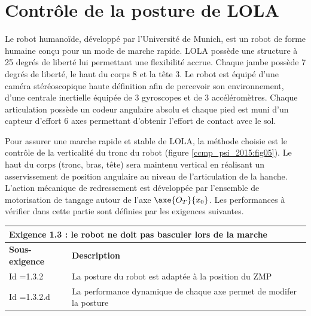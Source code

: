 \section{Contrôle de la posture de LOLA}%

\ifprof
\else
Le robot humanoïde, développé par l’Université de Munich, est un robot de forme humaine conçu pour un mode de marche rapide. LOLA possède une structure à 25 degrés de liberté lui permettant une flexibilité accrue. Chaque jambe possède 7 degrés de liberté, le haut du corps 8 et la tête 3. Le robot est équipé d’une caméra stéréoscopique haute définition afin de percevoir son environnement, d’une centrale inertielle équipée de 3 gyroscopes et de 3 accéléromètres. Chaque articulation possède un codeur angulaire absolu et chaque pied est muni d’un capteur d’effort 6 axes permettant d’obtenir l’effort de contact avec le sol.


\label{ccmp_psi_2015:p02}
Pour assurer une marche rapide et stable de LOLA, la méthode choisie est le contrôle de la verticalité du tronc du robot (figure \ref{ccmp_psi_2015:fig05}). Le haut du corps (tronc, bras, tête) sera maintenu vertical en réalisant un asservissement de position angulaire au niveau de l'articulation de la hanche. L'action mécanique de redressement est développée par l'ensemble de motorisation de tangage autour de l'axe $\axe{O_T}{x_0}$. Les performances à vérifier dans cette partie sont définies par les exigences suivantes.



\begin{center}
\begin{tabular}{ll}
\multicolumn{2}{l}{Exigence 1.3 : le robot ne doit pas basculer lors de la marche} \\
\hline
\textbf{Sous-exigence} & \textbf{Description} \\
\hline
Id =1.3.2 & La posture du robot est adaptée à la position du ZMP \\
Id =1.3.2.d & La performance dynamique de chaque axe permet de modifer la posture\\
\hline
\end{tabular}
\end{center}



